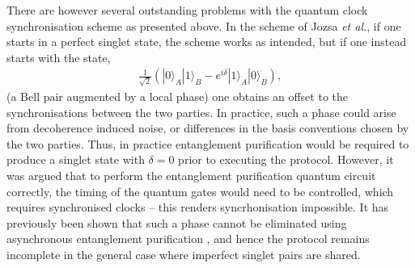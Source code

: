 There are however several outstanding problems with the quantum clock synchronisation scheme as presented above. In the scheme of Jozsa \textit{et al.}, if one starts in a perfect singlet state, the scheme works as intended, but if one instead starts with the state, 
\begin{align}
\frac{1}{\sqrt{2}} ( | 0 \rangle_A | 1 \rangle_B - e^{i \delta} | 1 \rangle_A | 0 \rangle_B ),
\end{align}
(a Bell pair augmented by a local phase) one obtains an offset to the synchronisations between the two parties. In practice, such a phase could arise from decoherence induced noise, or differences in the basis conventions chosen by the two parties. Thus, in practice entanglement purification would be required to produce a singlet state with \mbox{$\delta=0$} prior to executing the protocol. However, it was argued that to perform the entanglement purification quantum circuit correctly, the timing of the quantum gates would need to be controlled, which requires synchronised clocks \cite{bib:preskill2000quantum} --  this renders syncrhonisation impossible. It has previously been shown that such a phase cannot be eliminated using asynchronous entanglement purification \cite{bib:yurtsever02}, and hence the protocol remains incomplete in the general case where imperfect singlet pairs are shared.

